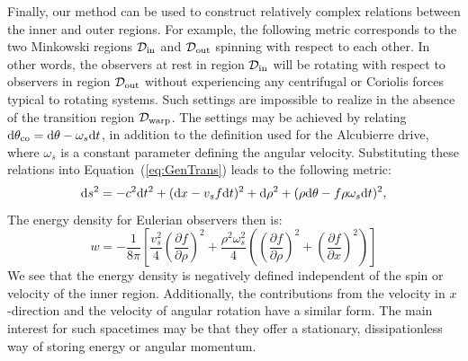 \documentclass[10pt]{iopart}
\begin{document}
Finally, our method can be used to construct relatively complex relations between the inner and outer regions. For example, the following metric corresponds to the two Minkowski regions $\mathcal{D}_{\rm in}$ and $\mathcal{D}_{\rm out}$ spinning with respect to each other. In other words, the observers at rest in region $\mathcal{D}_{\rm in}$ will be rotating with respect to observers in region $\mathcal{D}_{\rm out}$ without experiencing any centrifugal or Coriolis forces typical to rotating systems. Such settings are impossible to realize in the absence of the transition region $\mathcal{D}_{\rm warp}$. The settings may be achieved by relating ${\rm d}\theta_{\rm co}={\rm d}\theta - \omega_s {\rm d}t$, in addition to the definition used for the Alcubierre drive, where $\omega_s$ is a constant parameter defining the angular velocity. Substituting these relations into Equation~(\ref{eq:GenTrans}) leads to the following metric:
\begin{equation}
    {\rm d}s^2=-c^2 {\rm d} t^2 + ({\rm d}x-v_s f {\rm d}t)^2+{\rm d}\rho^2 + (\rho{\rm d}\theta-f\rho \omega_s {\rm d}t)^2,
    \label{eq:AlcAlt}
\end{equation}
The energy density for Eulerian observers then is:
\begin{equation}
    w=-\frac{1}{8\pi}\left[\frac{v_s^2}{4}\left(\frac{{\partial} f}{{\partial} \rho}\right)^2 + \frac{\rho^2\omega_s^2}{4}\left(\left(\frac{{\partial} f}{{\partial} \rho}\right)^2 + \left(\frac{{\partial} f}{{\partial} x}\right)^2\right)\right]
\end{equation}
We see that the energy density is negatively defined independent of the spin or velocity of the inner region. Additionally, the contributions from the velocity in $x$-direction and the velocity of angular rotation have a similar form. The main interest for such spacetimes may be that they offer a stationary, dissipationless way of storing energy or angular momentum.






\end{document}
